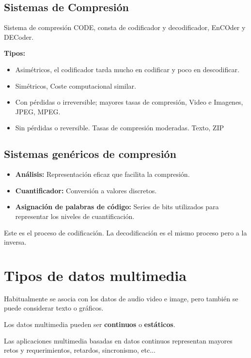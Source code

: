 \documentclass[11pt,a4paper]{article}
\begin{document}
\subsection{Sistemas de Compresión}

\begin{DefBox}
Sistema de compresión CODE, consta de codificador y decodificador, EnCOder y DECoder.
\end{DefBox}

\textbf{Tipos:}
\begin{itemize}
	\item Asimétricos, el codificador tarda mucho en codificar y poco en descodificar.
	\item Simétricos, Coste computacional similar.
	\item Con pérdidas o irreversible; mayores tasas de compresión, Video e Imagenes, JPEG, MPEG.
	\item Sin pérdidas o reversible. Tasas de compresión moderadas. Texto, ZIP
\end{itemize}

\subsection{Sistemas genéricos de compresión}
\begin{itemize}
	\item \textbf{Análisis:} Representación eficaz que facilita la compresión.
	\item \textbf{Cuantificador:} Conversión a valores discretos.
	\item \textbf{Asignación de palabras de código:} Series de bits utilizados para representar los niveles de cuantificación.
\end{itemize}

Este es el proceso de codificación. La decodificación es el mismo proceso pero a la inversa.

\section{Tipos de datos multimedia}

\begin{NotaBox}
Habitualmente se asocia con los datos de audio video e image, pero también se puede considerar texto o gráficos.

Los datos multimedia pueden ser \textbf{continuos} o \textbf{estáticos}.

Las aplicaciones multimedia basadas en datos continuos representan mayores retos y requerimientos, retardos, sincronismo, etc...
\end{NotaBox}
\end{document}
